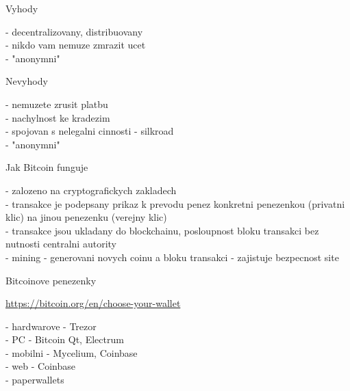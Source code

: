 \documentclass{beamer}
\begin{document}
\begin{frame}

    {\LARGE Vyhody}\\

    \vspace{5mm}

    - decentralizovany, distribuovany\\
    - nikdo vam nemuze zmrazit ucet\\
    - "anonymni"\\

    \vspace{10mm}

    {\LARGE Nevyhody}\\

    \vspace{5mm}

    - nemuzete zrusit platbu\\
    - nachylnost ke kradezim\\
    - spojovan s nelegalni cinnosti - silkroad\\
    - "anonymni"\\

\end{frame}

\begin{frame}

    {\LARGE Jak Bitcoin funguje}\\

    \vspace{5mm}

    - zalozeno na cryptografickych zakladech\\
    - transakce je podepsany prikaz k prevodu penez konkretni penezenkou (privatni klic) na jinou penezenku (verejny klic)\\
    - transakce jsou ukladany do blockchainu, posloupnost bloku transakci bez nutnosti centralni autority\\
    - mining - generovani novych coinu a bloku transakci - zajistuje bezpecnost site\\

\end{frame}

\begin{frame}

    {\LARGE Bitcoinove penezenky}\\

    \vspace{5mm}

    \url{https://bitcoin.org/en/choose-your-wallet}

    \vspace{5mm}

    - hardwarove - Trezor\\
    - PC - Bitcoin Qt, Electrum\\
    - mobilni - Mycelium, Coinbase\\
    - web - Coinbase\\
    - paperwallets\\

\end{frame}
\end{document}
